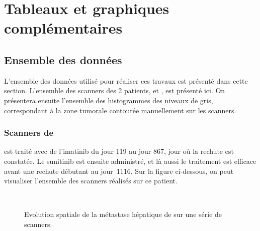 \documentclass[main.tex]{subfiles}
\begin{document}

\chapter{Tableaux et graphiques complémentaires \label{chap:anx_img_complement}}

\section{Ensemble des données}
L'ensemble des données utilisé pour réaliser ces travaux est présenté dans cette section. L'ensemble des scanners des 2 patients, \Nber et \Chen, est présenté ici. On présentera ensuite l'ensemble des histogrammes des niveaux de gris, correspondant à la zone tumorale contourée manuellement sur les scanners.

\newpage
\subsection{Scanners de \Nber}
\Nber est traité avec de l'imatinib du jour 119 au jour 867, jour où la rechute est constatée. Le sunitinib est ensuite administré, et là aussi le traitement est efficace avant une rechute débutant au jour~1116. Sur la figure ci-dessous, on peut visualiser l'ensemble des scanners réalisés sur ce patient.

\begin{figure}[h!]
\centering\hfill
{}
\\
\caption{\label{fig:nber_complete_scan}Evolution spatiale de la métastase hépatique de \Nber sur une série de scanners.}
\vspace{-5mm}
\end{figure}
\end{document}
